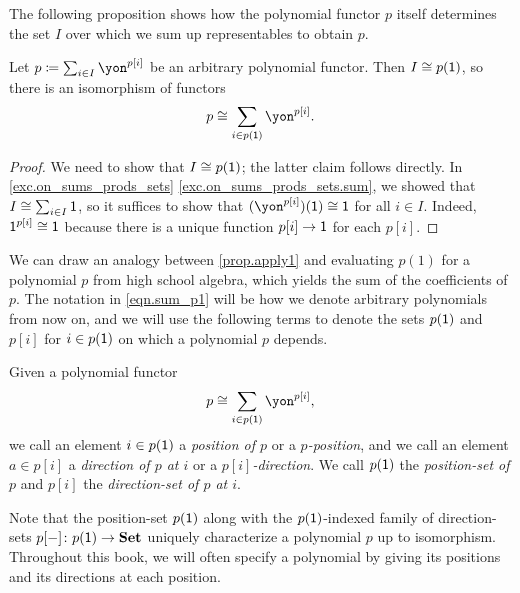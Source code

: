 \documentclass[Book-Poly]{subfiles}
\begin{document}
The following proposition shows how the polynomial functor $p$ itself determines the set $I$ over which we sum up representables to obtain $p$.


\begin{proposition}\label{prop.apply1}
    Let $p\coloneqq\sum_{i\in I}\yon^{p[i]}$ be an arbitrary polynomial functor. Then $I\cong p(\textsf{1})$, so there is an isomorphism of functors
    \begin{equation}\label{eqn.sum_p1}
        p\iso\sum_{i\in p(\1)}\yon^{p[i]}.
    \end{equation}
\end{proposition}
\begin{proof}
    We need to show that $I\cong p(\textsf{1})$; the latter claim follows directly.
    In \cref{exc.on_sums_prods_sets} \cref{exc.on_sums_prods_sets.sum}, we showed that $I\cong\sum_{i\in I}\textsf{1}$, so it suffices to show that $(\yon^{p[i]})(\1)\iso\1$ for all $i \in I$.
    Indeed, $\textsf{1}^{p[i]}\cong \textsf{1}$ because there is a unique function $p[i]\to \textsf{1}$ for each $p[i]$.
\end{proof}
We can draw an analogy between \cref{prop.apply1} and evaluating $p(1)$ for a polynomial $p$ from high school algebra, which yields the sum of the coefficients of $p$.
The notation in \eqref{eqn.sum_p1} will be how we denote arbitrary polynomials from now on, and we will use the following terms to denote the sets $p(\textsf{1})$ and $p[i]$ for $i\in p(\textsf{1})$ on which a polynomial $p$ depends.

\begin{definition}
    Given a polynomial functor
    \[
    p\iso\sum_{i\in p(\1)}\yon^{p[i]},
    \]
    we call an element $i\in p(\textsf{1})$ a \emph{position of $p$} or a \emph{$p$-position}, and we call an element $a\in p[i]$ a \emph{direction of $p$ at $i$} or a \emph{$p[i]$-direction}.
    We call $p(\textsf{1})$ the \emph{position-set of $p$} and $p[i]$ the \emph{direction-set of $p$ at $i$}.
\end{definition}


Note that the position-set $p(\textsf{1})$ along with the $p(\textsf{1})$-indexed family of direction-sets $p[-]\colon p(\textsf{1})\to\mathbf{Set}$ uniquely characterize a polynomial $p$ up to isomorphism.
Throughout this book, we will often specify a polynomial by giving its positions and its directions at each position.
\end{document}
